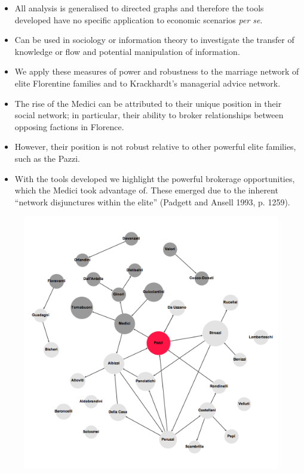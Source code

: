 \documentclass[10pt]{beamer}
\begin{document}
\begin{frame}
\begin{itemize}
\item All analysis is generalised to directed graphs and therefore the tools developed have no specific application to economic scenarios \emph{per se}.
\medskip
\item Can be used in sociology or information theory to investigate the transfer of knowledge or flow and potential manipulation of information.
\medskip
\item We apply these measures of power and robustness to the marriage network of elite Florentine families and to Krackhardt's managerial advice network.
\medskip
\item The rise of the Medici can be attributed to their unique position in their social network; in particular, their ability to broker relationships between opposing factions in Florence.
\medskip
\item However, their position is not robust relative to other powerful elite families, such as the Pazzi.
\end{itemize}
\end{frame}


\begin{frame}
\begin{itemize}
\item With the tools developed we highlight the powerful brokerage opportunities, which the Medici took advantage of. These emerged due to the inherent ``network disjunctures within the elite'' (Padgett and Ansell 1993, p. 1259).
\end{itemize}
\begin{figure}[h]
\centering
\includegraphics[scale=0.1]{../Images/Florentine-marr.png}
\end{figure}
\end{frame}
\end{document}
